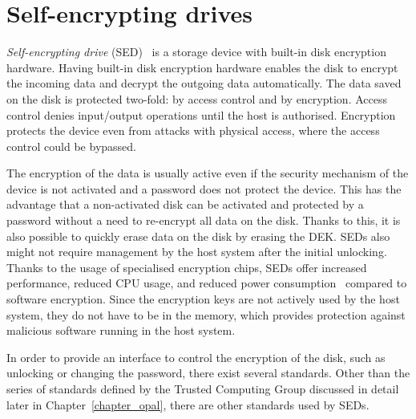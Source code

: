 \section{Self-encrypting drives}

\emph{Self-encrypting drive} (SED)~\cite{tcg-use-case-white-paper} is a storage device with built-in disk encryption hardware. Having built-in disk encryption hardware enables the disk to encrypt the incoming data and decrypt the outgoing data automatically. 
The data saved on the disk is protected two-fold: by access control and by encryption.
Access control denies input/output operations until the host is authorised.
Encryption protects the device even from attacks with physical access, where the access control could be bypassed.

The encryption of the data is usually active even if the security mechanism of the device is not activated and a password does not protect the device. This has the advantage that a non-activated disk can be activated and protected by a password without a need to re-encrypt all data on the disk. 
Thanks to this, it is also possible to quickly erase data on the disk by erasing the DEK.
SEDs also might not require management by the host system after the initial unlocking. 
Thanks to the usage of specialised encryption chips, SEDs offer increased performance, reduced CPU usage, and reduced power consumption~\cite{comparing_the_power} compared to software encryption.
Since the encryption keys are not actively used by the host system, they do not have to be in the memory, which provides protection against malicious software running in the host system. 

In order to provide an interface to control the encryption of the disk, such as unlocking or changing the password, there exist several standards. Other than the series of standards defined by the Trusted Computing Group discussed in detail later in Chapter~\ref{chapter_opal}, there are other standards used by SEDs.





